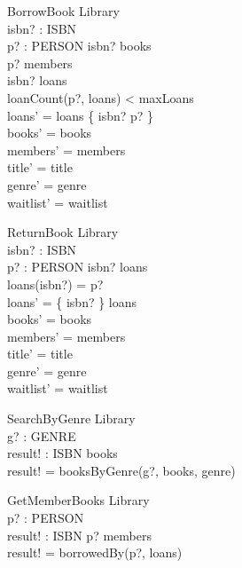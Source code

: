 \documentclass{article}
\begin{document}
\begin{schema}{BorrowBook}
  \Delta Library \\
  isbn? : ISBN \\
  p? : PERSON
\where
  isbn? \in books \\
  p? \in members \\
  isbn? \notin \dom loans \\
  loanCount(p?, loans) < maxLoans \\
  loans' = loans \cup \{ isbn? \mapsto p? \} \\
  books' = books \\
  members' = members \\
  title' = title \\
  genre' = genre \\
  waitlist' = waitlist
\end{schema}

\begin{schema}{ReturnBook}
  \Delta Library \\
  isbn? : ISBN \\
  p? : PERSON
\where
  isbn? \in \dom loans \\
  loans(isbn?) = p? \\
  loans' = \{ isbn? \} \ndres loans \\
  books' = books \\
  members' = members \\
  title' = title \\
  genre' = genre \\
  waitlist' = waitlist
\end{schema}

\begin{schema}{SearchByGenre}
  \Xi Library \\
  g? : GENRE \\
  result! : \power ISBN
\where
  books \neq \emptyset \\
  result! = booksByGenre(g?, books, genre)
\end{schema}

\begin{schema}{GetMemberBooks}
  \Xi Library \\
  p? : PERSON \\
  result! : \power ISBN
\where
  p? \in members \\
  result! = borrowedBy(p?, loans)
\end{schema}
\end{document}
